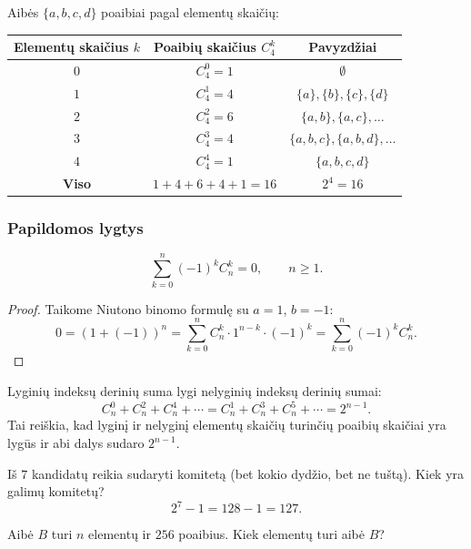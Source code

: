 \begin{example}
Aibės $\{a, b, c, d\}$ poaibiai pagal elementų skaičių:
\renewcommand{\arraystretch}{1.3}
\begin{center}
\begin{tabular}{|c|c|c|}
\hline
Elementų skaičius $k$ & Poaibių skaičius $C_4^k$ & Pavyzdžiai \\
\hline
$0$ & $C_4^0 = 1$ & $\emptyset$ \\
$1$ & $C_4^1 = 4$ & $\{a\}, \{b\}, \{c\}, \{d\}$ \\
$2$ & $C_4^2 = 6$ & $\{a,b\}, \{a,c\}, \ldots$ \\
$3$ & $C_4^3 = 4$ & $\{a,b,c\}, \{a,b,d\}, \ldots$ \\
$4$ & $C_4^4 = 1$ & $\{a,b,c,d\}$ \\
\hline
\textbf{Viso} & $1+4+6+4+1 = 16$ & $2^4 = 16$ \\
\hline
\end{tabular}
\end{center}
\end{example}

\subsubsection*{Papildomos lygtys}

\begin{theorem}
\[
\sum_{k=0}^{n} (-1)^k C_n^k = 0, \qquad n \geq 1.
\]
\end{theorem}

\begin{proof}
Taikome Niutono binomo formulę su $a = 1$, $b = -1$:
\[
0 = (1 + (-1))^n = \sum_{k=0}^{n} C_n^k \cdot 1^{n-k} \cdot (-1)^k = \sum_{k=0}^{n} (-1)^k C_n^k.
\]
\end{proof}

\begin{corollary}
Lyginių indeksų derinių suma lygi nelyginių indeksų derinių sumai:
\[
C_n^0 + C_n^2 + C_n^4 + \cdots = C_n^1 + C_n^3 + C_n^5 + \cdots = 2^{n-1}.
\]
Tai reiškia, kad lyginį ir nelyginį elementų skaičių turinčių poaibių skaičiai yra lygūs ir abi dalys sudaro $2^{n-1}$.
\end{corollary}

\begin{example}
Iš $7$ kandidatų reikia sudaryti komitetą (bet kokio dydžio, bet ne tuštą). Kiek yra galimų komitetų?
\[
2^7 - 1 = 128 - 1 = 127.
\]
\end{example}

\begin{exercise}
Aibė $B$ turi $n$ elementų ir $256$ poaibius. Kiek elementų turi aibė $B$?
\end{exercise}

